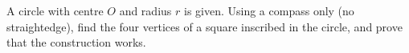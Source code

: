 A circle with centre $O$ and radius $r$ is given. Using a compass only (no straightedge), find the four vertices of a square inscribed in the circle, and prove that the construction works.
